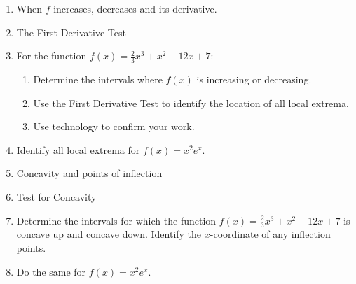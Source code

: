 \documentclass[11pt,fleqn]{article}
\begin{document}
\setlength{\parindent}{0cm}
\renewcommand{\headrulewidth}{0pt}
\newcommand{\blank}[1]{\rule{#1}{0.75pt}}
\renewcommand{\d}{\displaystyle}
\vspace*{-0.7in}
\begin{center}
 {\large{ }}
\end{center}
 \begin{enumerate}
 \item When $f$ increases, decreases and its derivative.
 \vspace{2in}
 \item The First Derivative Test
 \vspace{1in}
 \item For the function $f(x)=\frac{2}{3}x^3+x^2-12x+7$: 
 \begin{enumerate}
 	\item Determine the intervals where $f(x)$ is increasing or decreasing.
	\item Use the First Derivative Test to identify the location of all local extrema.
	\item Use technology to confirm your work.
\end{enumerate}
\vfill
\newpage
\item Identify all local extrema for $f(x)=x^2e^x.$
\vspace{1.5in}
\item Concavity and points of inflection
\vspace{2in}
\item Test for Concavity
\vspace{1in}
\item Determine the intervals for which the function $f(x)=\frac{2}{3}x^3+x^2-12x+7$ is concave up and concave down. Identify the $x$-coordinate of any inflection points.
\vfill
\item Do the same for $f(x)=x^2e^x.$
\vfill
 
 \end{enumerate}
\end{document}
